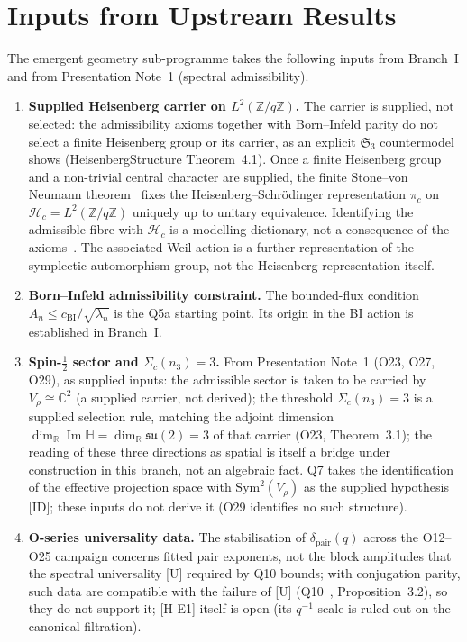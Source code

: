 \documentclass[11pt,a4paper]{article}
\theoremstyle{definition}
\newcommand{\su}{\mathfrak{su}}
\newcommand{\Sym}{\mathrm{Sym}}
\renewcommand{\Im}{\operatorname{Im}}
\begin{document}
  \section{Inputs from Upstream Results}
    \label{sec:inputs}

    The emergent geometry sub-programme takes the following inputs from Branch~I and from
    Presentation Note~1 (spectral admissibility).

    \begin{enumerate}
      \item \textbf{Supplied Heisenberg carrier on $L^2(\mathbb{Z}/q\mathbb{Z})$.}
      The carrier is supplied, not selected: the admissibility axioms together with
      Born--Infeld parity do not select a finite Heisenberg group or its carrier, as an explicit
      $\mathfrak{S}_3$ countermodel shows (HeisenbergStructure Theorem~4.1).
      Once a finite Heisenberg group and a non-trivial central character are supplied,
      the finite Stone--von Neumann theorem~\cite{GurevichHadani2009} fixes the
      Heisenberg--Schr\"{o}dinger representation $\pi_c$ on
      $\mathcal{H}_c = L^2(\mathbb{Z}/q\mathbb{Z})$ uniquely up to unitary equivalence.
      Identifying the admissible fibre with $\mathcal{H}_c$ is a modelling dictionary, not a
      consequence of the axioms~\cite{Beau2026m,Beau2026HeisenbergStructure}.
      The associated Weil action is a further representation of the symplectic automorphism
      group, not the Heisenberg representation itself.

      \item \textbf{Born--Infeld admissibility constraint.}
      The bounded-flux condition $A_n \leq c_{\mathrm{BI}}/\sqrt{\lambda_n}$ is the Q5a starting point.
      Its origin in the BI action is established in Branch~I.

      \item \textbf{Spin-$\tfrac{1}{2}$ sector and $\Sigma_c(n_3) = 3$.}
      From Presentation Note~1 (O23, O27, O29), as supplied inputs: the admissible sector is
      taken to be carried by $V_\rho \cong \mathbb{C}^2$ (a supplied carrier, not derived);
      the threshold $\Sigma_c(n_3) = 3$ is a supplied selection rule, matching the adjoint
      dimension $\dim_{\mathbb{R}} \Im\mathbb{H} = \dim_{\mathbb{R}} \su(2) = 3$ of that
      carrier (O23, Theorem~3.1); the reading of these three directions as spatial is itself
      a bridge under construction in this branch, not an algebraic fact.
      Q7 takes the identification of the effective projection space with $\Sym^2(V_\rho)$ as the
      supplied hypothesis [ID]; these inputs do not derive it (O29 identifies no such
      structure).

      \item \textbf{O-series universality data.}
      The stabilisation of $\delta_{\mathrm{pair}}(q)$ across the O12--O25 campaign concerns fitted
      pair exponents, not the block amplitudes that the spectral universality [U] required by Q10
      bounds; with conjugation parity, such data are compatible with the failure of [U]
      (Q10~\cite{Beau2026q10}, Proposition~3.2), so they do not support it; [H-E1] itself is open
      (its $q^{-1}$ scale is ruled out on the canonical filtration).
    \end{enumerate}
\end{document}
